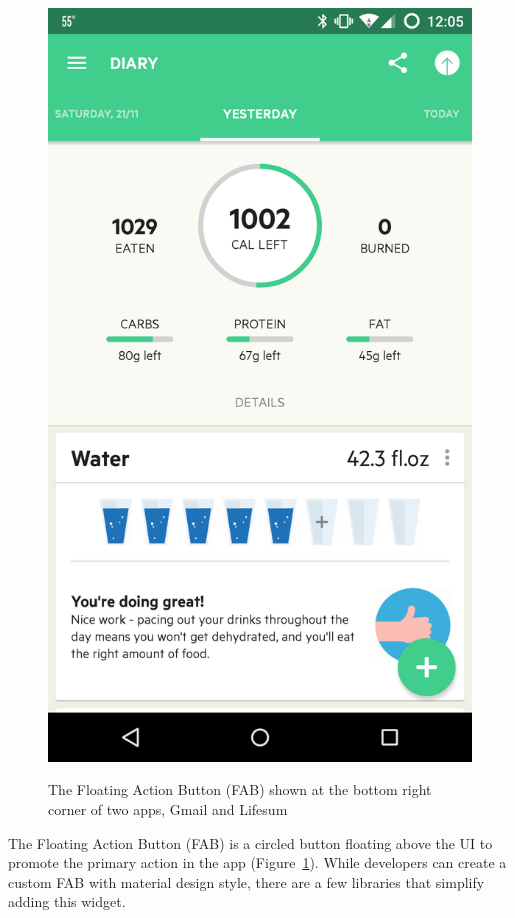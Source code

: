 \begin{figure}[H]
	{{\includegraphics[scale=0.1]{figures/findings/fab-lifesum.png} }}%
	\caption{The Floating Action Button (FAB) shown at the bottom right corner of two apps, Gmail and Lifesum}%
	\label{fig:figure_fab_screenshot}
\end{figure}
The Floating Action Button (FAB) is a circled button floating above the UI to promote the primary action in the app (Figure~\ref{fig:figure_fab_screenshot}).
While developers can create a custom FAB with material design style, there are a few libraries that simplify adding this widget.
